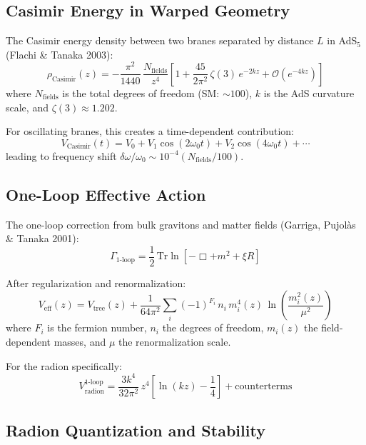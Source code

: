 \subsection{Casimir Energy in Warped Geometry}

The Casimir energy density between two branes separated by distance $L$ in AdS$_5$ (Flachi \& Tanaka 2003):
\begin{equation}
\rho_\text{Casimir}(z) = -\frac{\pi^2}{1440}\,\frac{N_\text{fields}}{z^4}\left[1 + \frac{45}{2\pi^2}\,\zeta(3)\,e^{-2kz} + \mathcal{O}(e^{-4kz})\right]
\end{equation}
where $N_\text{fields}$ is the total degrees of freedom (SM: $\sim 100$), $k$ is the AdS curvature scale, and $\zeta(3) \approx 1.202$.

For oscillating branes, this creates a time-dependent contribution:
\begin{equation}
V_\text{Casimir}(t) = V_0 + V_1\cos(2\omega_0 t) + V_2\cos(4\omega_0 t) + \cdots
\end{equation}
leading to frequency shift $\delta\omega/\omega_0 \sim 10^{-4}(N_\text{fields}/100)$.

\subsection{One-Loop Effective Action}

The one-loop correction from bulk gravitons and matter fields (Garriga, Pujol\`as \& Tanaka 2001):
\begin{equation}
\Gamma_\text{1-loop} = \frac{1}{2}\,\text{Tr}\ln\!\left[-\Box + m^2 + \xi R\right]
\end{equation}

After regularization and renormalization:
\begin{equation}
V_\text{eff}(z) = V_\text{tree}(z) + \frac{1}{64\pi^2}\sum_i (-1)^{F_i}\,n_i\,m_i^4(z)\,\ln\!\left(\frac{m_i^2(z)}{\mu^2}\right)
\end{equation}
where $F_i$ is the fermion number, $n_i$ the degrees of freedom, $m_i(z)$ the field-dependent masses, and $\mu$ the renormalization scale.

For the radion specifically:
\begin{equation}
V_\text{radion}^\text{1-loop} = \frac{3k^4}{32\pi^2}\,z^4\left[\ln(kz) - \frac{1}{4}\right] + \text{counterterms}
\end{equation}

\subsection{Radion Quantization and Stability}

